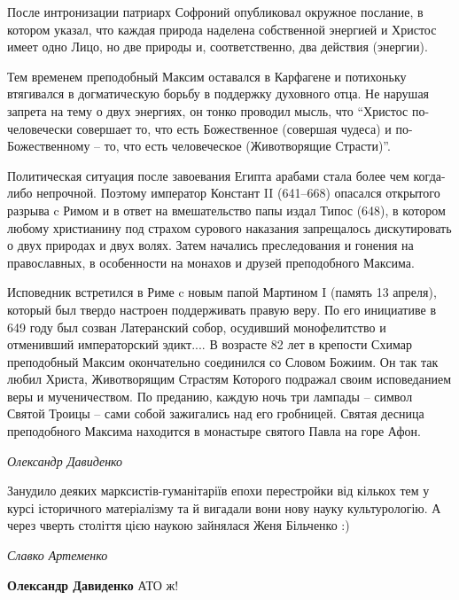 После интронизации патриарх Софроний опубликовал окружное послание, в котором
указал, что каждая природа наделена собственной энергией и Христос имеет одно
Лицо, но две природы и, соответственно, два действия (энергии).

Тем временем преподобный Максим оставался в Карфагене и потихоньку втягивался в
догматическую борьбу в поддержку духовного отца. Не нарушая запрета на тему о
двух энергиях, он тонко проводил мысль, что \enquote{Христос по-человечески совершает
то, что есть Божественное (совершая чудеса) и по-Божественному – то, что есть
человеческое (Животворящие Страсти)}.

Политическая ситуация после завоевания Египта арабами стала более чем
когда-либо непрочной. Поэтому император Констант II (641–668) опасался
открытого разрыва c Римом и в ответ на вмешательство папы издал Типос (648), в
котором любому христианину под страхом сурового наказания запрещалось
дискутировать о двух природах и двух волях. Затем начались преследования и
гонения на православных, в особенности на монахов и друзей преподобного
Максима.

Исповедник встретился в Риме c новым папой Мартином I (память 13 апреля),
который был твердо настроен поддерживать правую веру. По его инициативе в 649
году был созван Латеранский собор, осудивший монофелитство и отменивший
императорский эдикт.... В возрасте 82 лет в крепости Схимар преподобный Максим
окончательно соединился со Словом Божиим. Он так так любил Христа, Животворящим
Страстям Которого подражал своим исповеданием веры и мученичеством. По
преданию, каждую ночь три лампады – символ Святой Троицы – сами собой
зажигались над его гробницей. Святая десница преподобного Максима находится в
монастыре святого Павла на горе Афон.

\emph{Олександр Давиденко}

Занудило деяких марксистів-гуманітаріїв епохи перестройки від кількох тем у
курсі історичного матеріалізму та й вигадали вони нову науку культурологію. А
через чверть століття цією наукою зайнялася Женя Більченко :)

\emph{Славко Артеменко}

\textbf{Олександр Давиденко} АТО ж!
